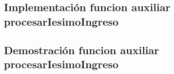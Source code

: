 \documentclass[a4paper]{article}
\begin{document}
\subsection{Implementaci\'on funcion auxiliar procesarIesimoIngreso}



\subsection{Demostraci\'on funcion auxiliar procesarIesimoIngreso}


\end{document}
